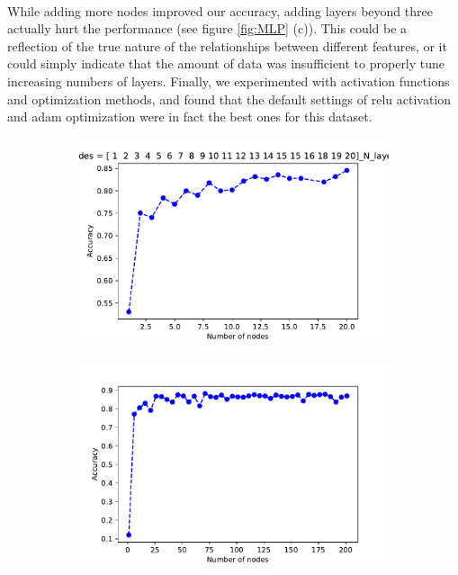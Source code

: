 \documentclass[11pt]{article}
\begin{document}
\paragraph{}While adding more nodes improved our accuracy, adding layers beyond three actually hurt the performance (see figure \ref{fig:MLP} (c)). This could be a reflection of the true nature of the relationships between different features, or it could simply indicate that the amount of data was insufficient to properly tune increasing numbers of layers. Finally, we experimented with activation functions and optimization methods, and found that the default settings of relu activation and adam optimization were in fact the best ones for this dataset.
\begin{figure}[] 
\centering
    \begin{subfigure}[!t]{0.3\textwidth}
        \includegraphics[width=\textwidth]{Plots/Alan_features_N_nodes_1_20_N_layers3.pdf}
    \end{subfigure}
        \begin{subfigure}[!t]{0.3\textwidth}
        \includegraphics[width=\textwidth]{Plots/Alan_features_N_nodes_6-201_N_layers3.pdf}

\end{subfigure}
\end{figure}
\end{document}
